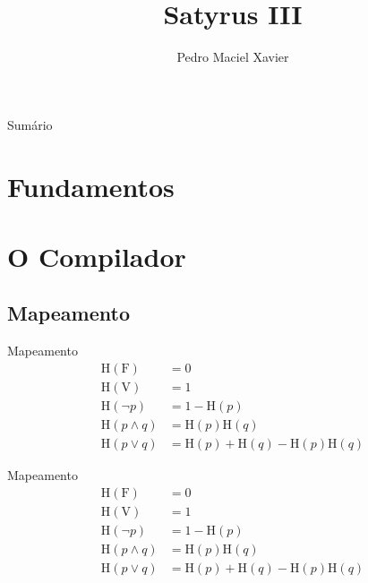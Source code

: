 \documentclass[brazil, MathSerif, aspectratio = 169]{beamer}
\author[Pedro Maciel]
{Pedro Maciel Xavier\break{\scriptsize sob orientação de Priscila Machado Vieira Lima}}
\title{Satyrus III}
\subtitle{\small }
\begin{document}
%
%

\begin{frame}[fragile]{Sumário}%
    \begin{multicols}{2}
        \tableofcontents
    \end{multicols}
\end{frame}


\hidelogo

\section{Fundamentos}
\SectionPage

\subsection{}
\begin{frame}{}
\end{frame}

\section{O Compilador}
\SectionPage

\subsection{Mapeamento}
\newcommand{\HH}[1]{\text{H}\left(#1\right)}
\begin{frame}{Mapeamento}
    \begin{align*}
        \HH{\text{F}}   & = 0                               \\
        \HH{\text{V}}   & = 1                               \\
        \HH{\neg p}     & = 1 - \HH{p}                      \\
        \HH{p \wedge q} & = \HH{p} \HH{q}                   \\
        \HH{p \vee q}   & = \HH{p} + \HH{q} - \HH{p} \HH{q}
    \end{align*}
\end{frame}

\begin{frame}{Mapeamento}
    \begin{align*}
        \HH{\text{F}}   & = 0                               \\
        \HH{\text{V}}   & = 1                               \\
        \HH{\neg p}     & = 1 - \HH{p}                      \\
        \HH{p \wedge q} & = \HH{p} \HH{q}                   \\
        \HH{p \vee q}   & = \HH{p} + \HH{q} - \HH{p} \HH{q}
    \end{align*}
\end{frame}
\end{document}
